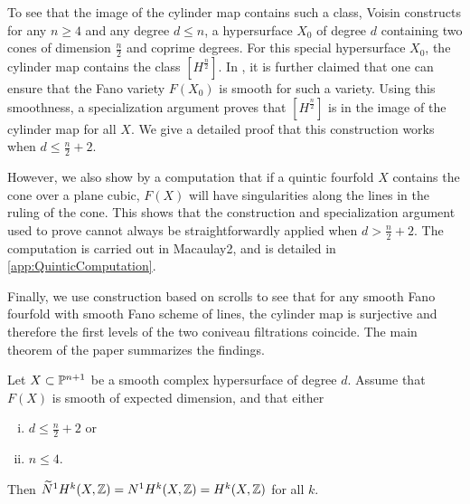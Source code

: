 To see that the image of the cylinder map contains such a class, Voisin constructs for any $n \geq 4$ and any degree $d \leq n$, a hypersurface $X_0$ of degree $d$ containing two cones of dimension $\frac{n}{2}$ and coprime degrees. For this special hypersurface $X_0$, the cylinder map contains the class $[H^{\frac{n}{2}}]$. In \cite{VoisinConiveauThreefolds}, it is further claimed that one can ensure that the Fano variety $F(X_0)$ is smooth for such a variety. Using this smoothness, a specialization argument proves that $[H^{\frac{n}{2}}]$ is in the image of the cylinder map for all $X$. We give a detailed proof that this construction works when $d \leq \frac{n}{2}+2$.

However, we also show by a computation that if a quintic fourfold $X$ contains the cone over a plane cubic, $F(X)$ will have singularities along the lines in the ruling of the cone. This shows that the construction and specialization argument used to prove \cite[Theorem 1.13]{VoisinConiveauThreefolds} cannot always be straightforwardly applied when $d > \frac{n}{2} + 2$. The computation is carried out in Macaulay2, and is detailed in \cref{app:QuinticComputation}.

Finally, we use construction based on scrolls to see that for any smooth Fano fourfold with smooth Fano scheme of lines, the cylinder map is surjective and therefore the first levels of the two coniveau filtrations coincide. The main theorem of the paper summarizes the findings.
\begin{theorem}
	\label{thm:ConiveauIntroductionPart}
	Let $X \subset \P^{n+1}$ be a smooth complex hypersurface of degree $d$. Assume that $F(X)$ is smooth of expected dimension, and that either
	\begin{enumerate}[i)]
		\item$d \leq \frac{n}{2}+2$ or 
		\item $n \leq 4$.
	\end{enumerate}
	Then $\widetilde{N}^1H^k(X,\Z) = N^1H^k(X,\Z) = H^k(X,\Z)$ for all $k$.
\end{theorem}

\printbibliography[heading = subbibliography]
